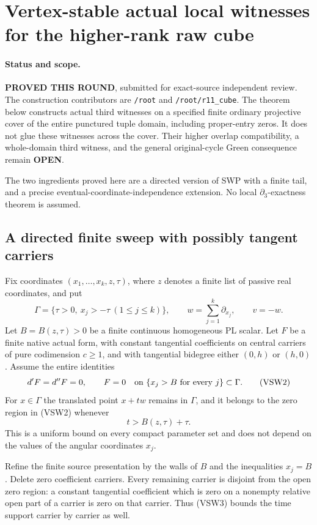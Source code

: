 \section{Vertex-stable actual local witnesses for the higher-rank raw cube}
\label{sec:r11-vertex-stable-local-cube}

\paragraph{Status and scope.}
\textbf{PROVED THIS ROUND}, submitted for exact-source independent
review.  The construction contributors are \texttt{/root} and
\texttt{/root/r11\_cube}.  The theorem below constructs actual
third witnesses on a specified finite ordinary projective cover
of the entire punctured tuple domain, including proper-entry zeros.
It does not glue these witnesses across the cover.  Their higher
overlap compatibility, a whole-domain third witness, and the general
original-cycle Green consequence remain \textbf{OPEN}.

The two ingredients proved here are a directed version of SWP with
a finite tail, and a precise eventual-coordinate-independence
extension.  No local $\partial_3$-exactness theorem is assumed.

\subsection{A directed finite sweep with possibly tangent carriers}

Fix coordinates $(x_1,\ldots,x_k,z,\tau)$, where $z$ denotes a
finite list of passive real coordinates, and put
\[
 \Gamma=\{\tau>0,\ x_j> -\tau\ (1\le j\le k)\},
 \qquad w=\sum_{j=1}^k\partial_{x_j},\qquad v=-w.
 \tag{VSW1}
\]
Let $B=B(z,\tau)>0$ be a finite continuous homogeneous PL scalar.
Let $F$ be a finite native actual form, with constant tangential
coefficients on central carriers of pure codimension $c\ge1$,
and with tangential bidegree either $(0,h)$ or $(h,0)$.
Assume the entire identities
\[
 d'F=d''F=0,\qquad
 F=0\quad\hbox{on }\{x_j>B\hbox{ for every }j\}\subset\Gamma.
 \tag{VSW2}
\]
For $x\in\Gamma$ the translated point $x+tw$ remains in
$\Gamma$, and it belongs to the zero region in (VSW2) whenever
\[
                              t>B(z,\tau)+\tau.
 \tag{VSW3}
\]
This is a uniform bound on every compact parameter set and does
not depend on the values of the angular coordinates $x_j$.

Refine the finite source presentation by the walls of $B$ and
the inequalities $x_j=B$.  Delete zero coefficient carriers.
Every remaining carrier is disjoint from the open zero region:
a constant tangential coefficient which is zero on a nonempty
relative open part of a carrier is zero on that carrier.
Thus (VSW3) bounds the time support carrier by carrier as well.

